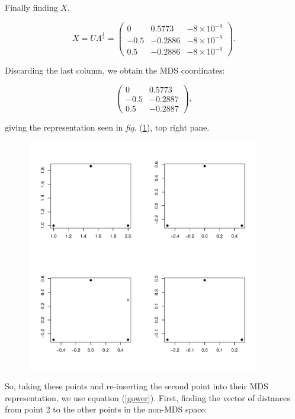 \documentclass[a4paper,10pt]{amsart}
\newcommand{\fig}[1]{\emph{fig.} (\ref{#1})}
\newcommand{\cross}{\times}
\begin{document}
Finally finding $X$,

\begin{equation}
X=U\Lambda^{\frac{1}{2}}= \begin{pmatrix} 
	0 & 0.5773 & -8\cross10^{-9}\\
	-0.5 & -0.2886 & -8\cross10^{-9}\\ 
	0.5 & -0.2886 & -8\cross10^{-9}
	\end{pmatrix}.
\end{equation}

Discarding the last column, we obtain the MDS coordinates:

\begin{equation}
\begin{pmatrix} 
	0 & 0.5773\\
	-0.5 & -0.2887\\ 
	0.5 & -0.2887
	\end{pmatrix},
\label{origMDScoords}
\end{equation}

giving the representation seen in \fig{cexample}, top right pane.

\begin{figure}
\centering
\includegraphics[width=4in]{figs/cexample-fig.pdf} \\
\caption{}
\label{cexample}
\end{figure}

So, taking these points and re-inserting the second point into their MDS representation, we use equation (\ref{gower}). First, finding the vector of distances from point 2 to the other points in the non-MDS space:
\end{document}
